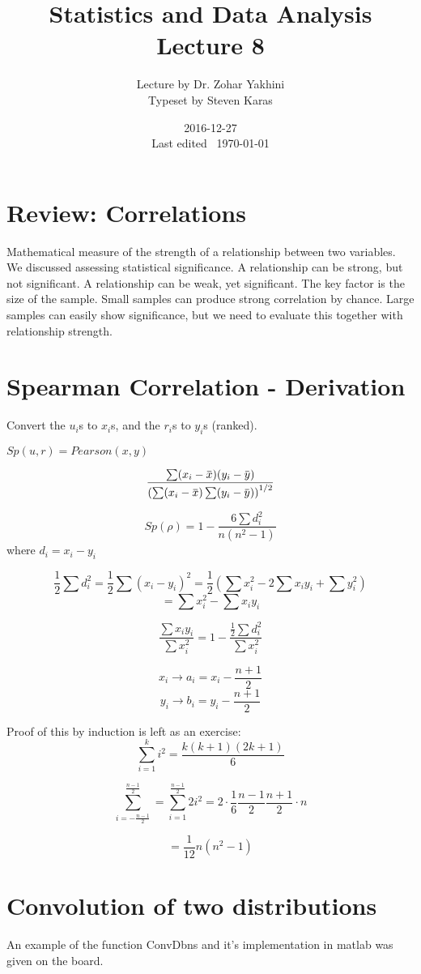 \documentclass[a4paper]{article}
\title{Statistics and Data Analysis\\\large Lecture 8}
\date{2016-12-27 \\ Last edited \currenttime\ \today}
\author{Lecture by Dr. Zohar Yakhini\\Typeset by Steven Karas}
\newcommand{\mean}[1]{\mkern 1.5mu\overline{\mkern-1.5mu#1\mkern-1.5mu}\mkern 1.5mu}
\begin{document}
\maketitle

\section{Review: Correlations}

Mathematical measure of the strength of a relationship between two variables.
We discussed assessing statistical significance.
A relationship can be strong, but not significant.
A relationship can be weak, yet significant.
The key factor is the size of the sample.
Small samples can produce strong correlation by chance.
Large samples can easily show significance, but we need to evaluate this together with relationship strength.

\section{Spearman Correlation - Derivation}
Convert the $u_i$s to $x_i$s, and the $r_i$s to $y_i$s (ranked).

$Sp(u,r)=Pearson(x,y)$

\[
\frac{\sum(x_i-\mean{x})(y_i-\mean{y})}
{\left(\sum(x_i-\mean{x})\sum(y_i-\mean{y})\right)^{1/2}}
\]

\[
Sp(\rho)=1-\frac{6\sum d_i^2}{n(n^2-1)}
\]
where $d_i=x_i-y_i$

\[
\frac{1}{2} \sum d_i^2 = \frac{1}{2} \sum (x_i - y_i)^2 = \frac{1}{2} \left(\sum x_i^2 -2\sum x_i y_i + \sum y_i^2 \right)
\]
\[=\sum x_i^2 - \sum x_i y_i\]

\[
\frac{\sum x_i y_i}{\sum x_i^2}
= 1 - \frac{\frac{1}{2} \sum d_i^2}{\sum x_i^2}
\]

\[x_i \to a_i=x_i-\frac{n+1}{2}\]
\[y_i \to b_i=y_i-\frac{n+1}{2}\]

Proof of this by induction is left as an exercise:
\[\sum_{i=1}^k i^2=\frac{k(k+1)(2k+1)}{6}\]

\[\sum_{i=-\frac{n-1}{2}}^{\frac{n-1}{2}} = \sum_{i=1}^{\frac{n-1}{2}} 2i^2 = 2 \cdot \frac{1}{6} \frac{n-1}{2} \frac{n+1}{2}\cdot n\]

\[=\frac{1}{12}n(n^2-1)\]

\section{Convolution of two distributions}
An example of the function ConvDbns and it's implementation in matlab was given on the board.
\end{document}
